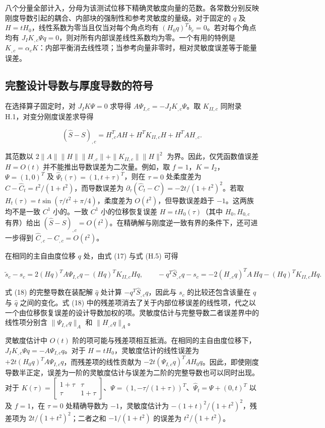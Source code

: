 \documentclass[preprint,12pt,authoryear]{elsarticle}
\begin{document}
八个分量全部计入，分母为该测试位移下精确灵敏度向量的范数。各常数分别反映刚度导数引起的耦合、内部块的强制性和参考灵敏度的量级。对于固定的 \(q\) 及 \(H=tH_0\)，线性系数为零当且仅当对每个角点均有 \((H_0q)^Tb_c=0\)。若对每个角点均有 \(J_IK_{,c}\Psi q=0\)，则对所有内部误差线性系数均为零。一个有用的特例是 \(K_{,c}=\alpha_cK\)：内部平衡消去线性项；当参考向量非零时，相对灵敏度误差等于能量误差。

\subsection{完整设计导数与厚度导数的符号}

在选择算子固定时，对 \(J_IK\Psi=0\) 求导得 \(A\Psi_{I,c}=-J_IK_{,c}\Psi\)。取 \(K_{II,c}\) 同附录 H.1，对变分刚度误差求导得

\[
\boxed{(\widehat S-S)_{,c}
=H_{,c}^TAH+H^TK_{II,c}H+H^TAH_{,c}.}
\tag{H.5}
\]

其范数以 \(2\|A\|\|H\|\|H_{,c}\|+\|K_{II,c}\|\|H\|^2\) 为界。因此，仅凭函数值误差 \(H=O(t)\) 并不能推出导数误差为二次量。例如，取 \(f=1\)，\(K=I_2\)，\(\Psi=(1,0)^T\) 及 \(\widehat\Psi_t(\tau)=(1,t+\tau)^T\)，则在 \(\tau=0\) 处柔度差为 \(C-\widehat C_t=t^2/(1+t^2)\)，而导数误差为 \(\partial_\tau(\widehat C_t-C)=-2t/(1+t^2)^2\)。若取 \(H_t(\tau)=t\sin(\tau/t^2+\pi/4)\)，柔度差为 \(O(t^2)\)，但导数误差趋于 \(-1\)。这两族均不是一致 \(C^1\) 小的。一致 \(C^1\) 小的位移恢复误差 \(H=tH_0(\tau)\)（其中 \(H_0,H_{0,c}\) 有界）给出 \((\widehat S-S)_{,c}=O(t^2)\)。在精确解与刚度逆一致有界的条件下，还可进一步得到 \(\widehat C_{,c}-C_{,c}=O(t^2)\)。

在相同的主自由度位移 \(q\) 处，由式 (17) 与式 (H.5) 可得

\[
\widetilde s_c-s_c=2(Hq)^TA\Psi_{I,c}q-(Hq)^TK_{II,c}Hq,\qquad
-q^T\widehat S_{,c}q-s_c=-2(H_{,c}q)^TA\,Hq-(Hq)^TK_{II,c}Hq.
\tag{H.6}
\]

式 (18) 的完整导数在装配解 \(\widehat q\) 处计算 \(-q^T\widehat S_{,c}q\)，因此与 \(s_c\) 的比较还包含该量在 \(q\) 与 \(\widehat q\) 之间的变化。式 (18) 中的残差项消去了关于内部位移误差的线性项，代之以一个由位移恢复误差的设计导数加权的项。灵敏度估计与完整导数二者误差界中的线性项分别含 \(\|\Psi_{I,c}q\|_A\) 和 \(\|H_{,c}q\|_A\)。

灵敏度估计中 \(O(t)\) 阶的项可能与残差项相互抵消。在相同的主自由度位移下，\(J_IK_{,c}\Psi q=-A\Psi_{I,c}q\)。对于 \(H=tH_0\)，灵敏度估计的线性误差为 \(+2t(H_0q)^TA\Psi_{I,c}q\)，而残差项的线性贡献为 \(-2t(\Psi_{I,c}q)^TAH_0q\)。因此，即使刚度导数半正定，误差为一阶的灵敏度估计与误差为二阶的完整导数也可以同时出现。对于 \(K(\tau)=\begin{bmatrix}1+\tau&\tau\\\tau&1+\tau\end{bmatrix}\)、\(\Psi=(1,-\tau/(1+\tau))^T\)、\(\widehat\Psi_t=\Psi+(0,t)^T\) 以及 \(f=1\)，在 \(\tau=0\) 处精确导数为 \(-1\)，灵敏度估计为 \(-(1+t)^2/(1+t^2)^2\)，残差项为 \(2t/(1+t^2)^2\)；二者之和 \(-1/(1+t^2)\) 的误差为 \(t^2/(1+t^2)\)。
\end{document}
